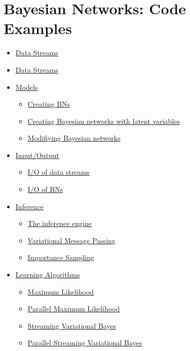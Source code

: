 \documentclass[10pt,a4paper]{article}
\begin{document}
\section{Bayesian Networks: Code Examples}\label{sec:bns}

\begin{itemize}
\item \hyperref[sec:bns:datastreams]{Data Streams}
\item \hyperref[sec:bns:randomvars]{Data Streams}
\item \hyperref[sec:bns:models]{Models}
\begin{itemize}
\item \hyperref[sec:bns:models:creating]{Creating BNs}
\item \hyperref[sec:bns:models:creatinglatent]{Creating Bayesian networks with latent variables}
\item \hyperref[sec:bns:models:modif]{Modifiying Bayesian networks}
\end{itemize}

	\item \hyperref[sec:bns:io]{Input/Output}
\begin{itemize}
	\item \hyperref[sec:bns:io:iods]{I/O of data streams}
	\item \hyperref[sec:bns:io:iobn]{I/O of BNs}
\end{itemize}


	\item \hyperref[sec:bns:inference]{Inference}
\begin{itemize}

	\item \hyperref[sec:bns:inference:engine]{The inference engine}
	\item \hyperref[sec:bns:inference:vmp]{Variational Message Passing}
	\item \hyperref[sec:bns:inference:sampling]{Importance Sampling}
\end{itemize}

\item \hyperref[sec:bns:learning]{Learning Algorithms}
\begin{itemize}
	\item \hyperref[sec:bns:learning:batchml]{Maximum Likelihood}
	\item \hyperref[sec:bns:learning:parallelml]{Parallel Maximum Likelihood}
	\item \hyperref[sec:bns:learning:svb]{Streaming Variational Bayes}
	\item \hyperref[sec:bns:learning:parallelsvb]{Parallel Streaming Variational Bayes}
\end{itemize}





\end{itemize}
\end{document}

